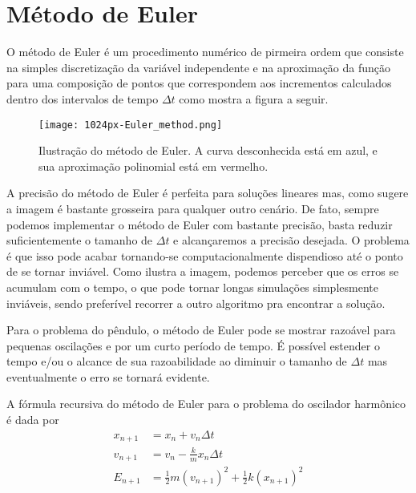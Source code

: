 \documentclass[12pt]{article}
\begin{document}
    \section*{Método de Euler}
    O método de Euler é um procedimento numérico de pirmeira ordem que consiste
    na simples discretização da variável independente e na aproximação da função
    para uma composição de pontos que correspondem aos incrementos
    calculados dentro dos intervalos de tempo $\Delta t$ como mostra a figura a seguir.
    \begin{figure}[h]
        \centering
        \texttt{[image: 1024px-Euler\_method.png]}
        \caption{Ilustração do método de Euler. A curva desconhecida está em azul, e sua aproximação polinomial está em vermelho.}
    \end{figure} 
    \par A precisão do método de Euler é perfeita para soluções lineares mas, como sugere a imagem
    é bastante grosseira para qualquer outro cenário. De fato, sempre podemos implementar o método
    de Euler com bastante precisão, basta reduzir suficientemente o tamanho de $\Delta t$ e
    alcançaremos a precisão desejada. O problema é que isso pode acabar tornando-se computacionalmente
    dispendioso até o ponto de se tornar inviável. Como ilustra a imagem, podemos perceber
    que os erros se acumulam com o tempo, o que pode tornar longas simulações simplesmente
    inviáveis, sendo preferível recorrer a outro algoritmo pra encontrar a solução.
    \par Para o problema do pêndulo, o método de Euler pode se mostrar razoável para pequenas
    oscilações e por um curto período de tempo. É possível estender o tempo e/ou o alcance de
    sua razoabilidade ao diminuir o tamanho de $\Delta t$ mas eventualmente o erro se tornará
    evidente.
    \par A fórmula recursiva do método de Euler para o problema do oscilador harmônico é dada por
    \begin{equation*}
        \boxed{
        \begin{aligned}
            x_{n+1}&=x_n+v_n\Delta t\\
            v_{n+1}&=v_n-\frac{k}{m}x_n\Delta t\\
            E_{n+1}&=\frac{1}{2}m\left(v_{n+1}\right)^2+\frac{1}{2}k(x_{n+1})^2
        \end{aligned}
        }
    \end{equation*}
\end{document}
